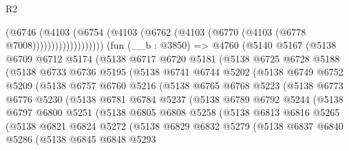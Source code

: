 \begin{lexlean}{R2}
\begin{coremodule}
                        (@6746
                          (@4103
                            (@6754
                              (@4103 (@6762 (@4103 (@6770 (@4103 (@6778 @7008)))))))))))))))))))
    (fun (__b : @3850) =>
    @4760
      (@5140
        @5167
        (@5138
          @6709
          @6712
          @5174
          (@5138
            @6717
            @6720
            @5181
            (@5138
              @6725
              @6728
              @5188
              (@5138
                @6733
                @6736
                @5195
                (@5138
                  @6741
                  @6744
                  @5202
                  (@5138
                    @6749
                    @6752
                    @5209
                    (@5138
                      @6757
                      @6760
                      @5216
                      (@5138
                        @6765
                        @6768
                        @5223
                        (@5138
                          @6773
                          @6776
                          @5230
                          (@5138
                            @6781
                            @6784
                            @5237
                            (@5138
                              @6789
                              @6792
                              @5244
                              (@5138
                                @6797
                                @6800
                                @5251
                                (@5138
                                  @6805
                                  @6808
                                  @5258
                                  (@5138
                                    @6813
                                    @6816
                                    @5265
                                    (@5138
                                      @6821
                                      @6824
                                      @5272
                                      (@5138
                                        @6829
                                        @6832
                                        @5279
                                        (@5138
                                          @6837
                                          @6840
                                          @5286
                                          (@5138
                                            @6845
                                            @6848
                                            @5293

\end{coremodule}
\end{lexlean}
